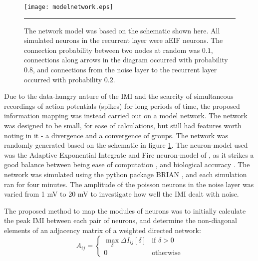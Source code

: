 \begin{figure}[thb]
  \centering
  \texttt{[image: modelnetwork.eps]}
  \rule{35em}{0.5pt}
  \caption{\label{modelnetwork}The network model was based on the schematic shown here.  All simulated neurons in the recurrent layer were aEIF neurons.  The connection probability between two nodes at random was $0.1$, connections along arrows in the diagram occurred with probability $0.8$, and connections from the noise layer to the recurrent layer occurred with probability $0.2$.}
\end{figure}

Due to the data-hungry nature of the IMI and the scarcity of simultaneous recordings of  action potentials (spikes) for long periods of time, the proposed information mapping was instead carried out on a model network.  The network was designed to be small, for ease of calculations, but still had features worth noting in it - a divergence and a convergence of groups.  The network was randomly generated based on the schematic in figure \ref{modelnetwork}.  The neuron-model used was the Adaptive Exponential Integrate and Fire neuron-model of \cite{BretteGerstner2005a}, as it strikes a good balance between being ease of computation \cite{HopfieldHerz1995a}, and biological accuracy \cite{HodgkinHuxley1952a}.  The network was simulated using the python package BRIAN \cite{GoodmanBrette2008a}, and each simulation ran for four minutes.  The amplitude of the poisson neurons in the noise layer was varied from 1 mV to 20 mV to investigate how well the IMI dealt with noise.

The proposed method to map the modules of neurons was to initially calculate the peak IMI between each pair of neurons, and determine the non-diagonal elements of an adjacency matrix of a weighted directed network:
\begin{equation}\label{adjmat}
A_{ij} = \left\{ \begin{array}{ll} \max_{\delta} \Delta I_{ij}[\delta] & \text{if } \delta>0 \\ 0 & \text{otherwise} \end{array}\right.
\end{equation}

